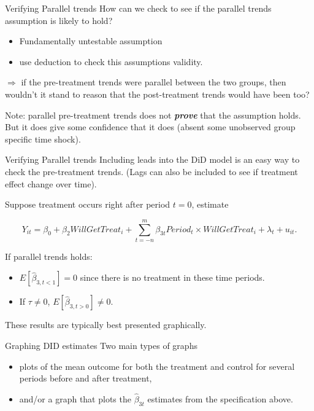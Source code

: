\documentclass[
  ignorenonframetext,
]{beamer}
\begin{document}
\begin{frame}{Verifying Parallel trends}
\protect\hypertarget{verifying-parallel-trends}{}
How can we check to see if the parallel trends assumption is likely to
hold?

\begin{itemize}
\item
  Fundamentally untestable assumption
\item
  use deduction to check this assumptions validity.
\end{itemize}

\(\Rightarrow\) if the pre-treatment trends were parallel between the
two groups, then wouldn't it stand to reason that the post-treatment
trends would have been too?

Note: parallel pre-treatment trends does not \textbf{\textit{prove}}
that the assumption holds. But it does give some confidence that it does
(absent some unobserved group specific time shock).
\end{frame}

\begin{frame}{Verifying Parallel trends}
\protect\hypertarget{verifying-parallel-trends-1}{}
Including leads into the DiD model is an easy way to check the
pre-treatment trends. (Lags can also be included to see if treatment
effect change over time).

Suppose treatment occurs right after period \(t=0\), estimate

\[
Y_{it}=\beta_0+\beta_2WillGetTreat_i+\sum_{t=-n}^m\beta_{3t}Period_t \times WillGetTreat_i+\lambda_t+u_{it}.
\]

If parallel trends holds:

\begin{itemize}
\item
  \(E[\hat{\beta}_{3,t<1}]=0\) since there is no treatment in these time
  periods.
\item
  If \(\tau\neq0\), \(E[\hat{\beta}_{3,t>0}]\neq0\).
\end{itemize}

These results are typically best presented graphically.
\end{frame}

\begin{frame}{Graphing DID estimates}
\protect\hypertarget{graphing-did-estimates}{}
Two main types of graphs

\begin{itemize}
\item
  plots of the mean outcome for both the treatment and control for
  several periods before and after treatment,
\item
  and/or a graph that plots the \(\hat{\beta}_{3t}\) estimates from the
  specification above.
\end{itemize}
\end{frame}
\end{document}
